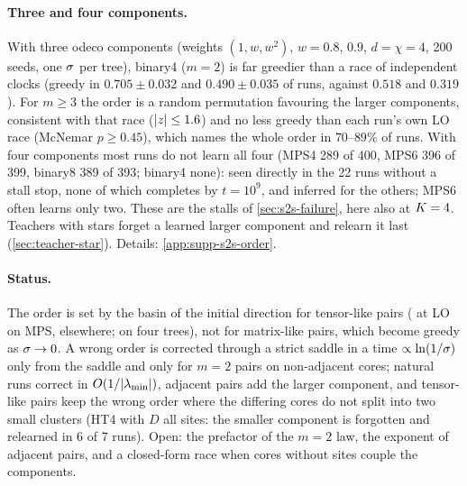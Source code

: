 \paragraph{Three and four components.}
\empirical{} With three odeco components (weights $(1,w,w^2)$, $w=0.8$, $0.9$, $d=\chi=4$, 200 seeds, one $\sigma$ per
tree), binary4 ($m=2$) is far greedier than a race of independent clocks (greedy in $0.705\pm0.032$ and
$0.490\pm0.035$ of runs, against $0.518$ and $0.319$). For $m\ge3$ the order is a random permutation favouring the
larger components, consistent with that race ($\lvert z\rvert\le1.6$) and no less greedy than each run's own LO race
(McNemar $p\ge0.45$), which names the whole order in $70$--$89\%$ of runs. With four components most runs do not
learn all four (MPS4 289 of 400, MPS6 396 of 399, binary8 389 of 393; binary4 none): seen directly in the 22 runs
without a stall stop, none of which completes by $t=10^9$, and inferred for the others; MPS6 often learns only two.
These are the stalls of \cref{sec:s2s-failure}, here also at $K=4$. Teachers
with stars forget a learned larger component and relearn it last (\cref{sec:teacher-star}). Details:
\cref{app:supp-s2s-order}. \newresult

\paragraph{Status.}
The order is set by the basin of the initial direction for tensor-like pairs (\proven{} at LO on MPS, \derived{}
elsewhere; \empirical{} on four trees), not for matrix-like pairs, which become greedy as $\sigma\to0$. A wrong order
is corrected through a strict saddle in a time $\propto\ln(1/\sigma)$ only from the saddle and only for $m=2$ pairs on
non-adjacent cores; natural runs correct in $O(1/\lvert\lambda_{\min}\rvert)$, adjacent pairs add the larger component,
and tensor-like pairs keep the wrong order where the differing cores do not split into two small clusters (HT4 with
$D$ all sites: the smaller component is forgotten and relearned in 6 of 7 runs). Open: the prefactor of the $m=2$ law, the exponent of adjacent pairs,
and a closed-form race when cores without sites couple the components.


